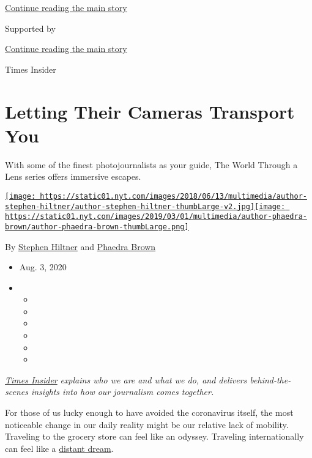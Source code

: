 \protect\hyperlink{after-top}{Continue reading the main story}

Supported by

\protect\hyperlink{after-sponsor}{Continue reading the main story}

Times Insider

\hypertarget{letting-their-cameras-transport-you}{%
\section{Letting Their Cameras Transport
You}\label{letting-their-cameras-transport-you}}

With some of the finest photojournalists as your guide, The World
Through a Lens series offers immersive escapes.

\href{https://www.nytimes.com/by/stephen-hiltner}{\texttt{[image: https://static01.nyt.com/images/2018/06/13/multimedia/author-stephen-hiltner/author-stephen-hiltner-thumbLarge-v2.jpg]}}\href{https://www.nytimes.com/by/phaedra-brown}{\texttt{[image: https://static01.nyt.com/images/2019/03/01/multimedia/author-phaedra-brown/author-phaedra-brown-thumbLarge.png]}}

By \href{https://www.nytimes.com/by/stephen-hiltner}{Stephen Hiltner}
and \href{https://www.nytimes.com/by/phaedra-brown}{Phaedra Brown}

\begin{itemize}
\item
  Aug. 3, 2020
\item
  \begin{itemize}
  \item
  \item
  \item
  \item
  \item
  \item
  \end{itemize}
\end{itemize}

\href{https://www.nytimes.com/series/times-insider}{\emph{Times
Insider}} \emph{explains who we are and what we do, and delivers
behind-the-scenes insights into how our journalism comes together.}

For those of us lucky enough to have avoided the coronavirus itself, the
most noticeable change in our daily reality might be our relative lack
of mobility. Traveling to the grocery store can feel like an odyssey.
Traveling internationally can feel like a
\href{https://www.nytimes.com/2020/07/28/travel/future-travel-bucket-list-coronavirus.html}{distant
dream}.

